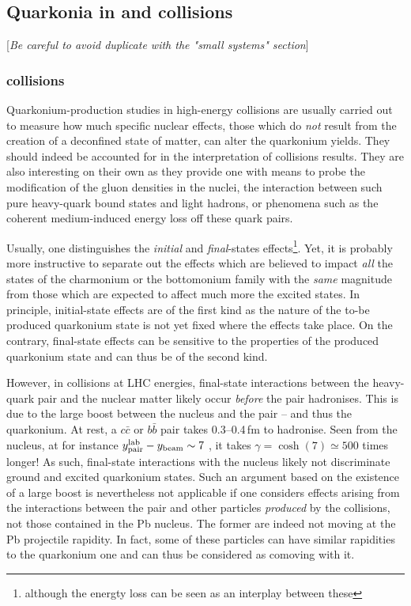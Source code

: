 \documentclass[../report.tex]{subfiles}
\begin{document}

\clearpage

\subsection{Quarkonia in \pPb and \pp collisions}%
[{\it Be careful to avoid duplicate with the "small systems" section}]


\subsubsection{\pPb collisions}
 Quarkonium-production studies in high-energy \pPb collisions are usually carried out to measure how much specific nuclear effects, those which do {\it not} result from the creation of a deconfined state of matter, can alter the quarkonium yields. They should indeed be accounted for in the interpretation of  \PbPb collisions results. They are also interesting on their own as they provide one with means to probe the modification of the gluon densities in the nuclei, the interaction between such pure heavy-quark bound states and light hadrons, or phenomena such as the coherent medium-induced energy loss off these quark pairs.
 
 Usually, one distinguishes the {\it initial} and {\it final}-states effects\footnote{although the energty loss can be seen as an interplay between these}. Yet, it is probably more instructive to separate out the effects which are believed to impact {\it all} the states of the charmonium or the bottomonium family with the {\it same} magnitude from those which are expected to affect much more the excited states. In principle, initial-state effects are of the first kind as the nature of the to-be produced quarkonium state is not yet fixed where the effects take place.  On the contrary, final-state effects can be sensitive to the properties of the produced quarkonium state and can thus be of the second kind.
 
However, in \pPb collisions at LHC energies, final-state interactions between the heavy-quark pair and the nuclear matter likely occur {\it before} the pair hadronises. This is due to the large boost between the nucleus and the pair -- and thus the quarkonium. At rest, a $c \bar c$ or $b\bar b$ pair takes 0.3--0.4\,fm to hadronise. Seen from the nucleus, at for instance $y^{\rm lab}_{\rm pair}-y_{\rm beam} \sim 7$ , it takes $\gamma=\cosh(7) \simeq 500$ times longer! As such, final-state interactions with the nucleus likely not discriminate ground and excited quarkonium states. Such an argument based on the existence of a large boost is nevertheless not applicable if one considers effects arising from the interactions between the pair and other particles {\it produced} by the \pPb collisions, not those contained in the Pb nucleus. The former are indeed not moving at the Pb projectile rapidity. In fact, some of these particles can have similar rapidities to the quarkonium one and can thus be considered as comoving with it.
 
\end{document}
